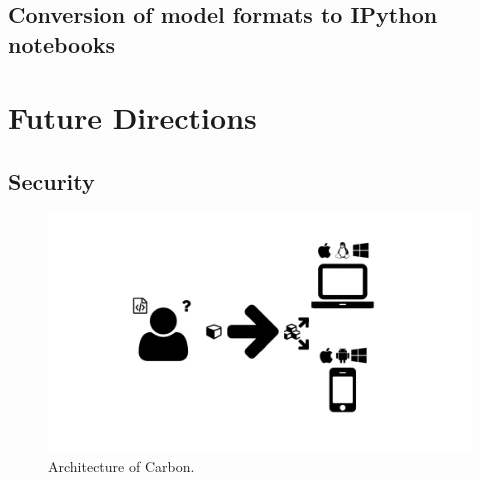 \subsection{Conversion of model formats to IPython notebooks}

\section{Future Directions}
\subsection{Security}

\begin{figure}
  \centering
  \includegraphics[width=\textwidth, page=28, trim=0cm 0cm 12cm 0cm, clip=true]{images/Figures.pdf}
  \caption{Architecture of Carbon.}
  \label{fig:carbon-architecture}
\end{figure}


